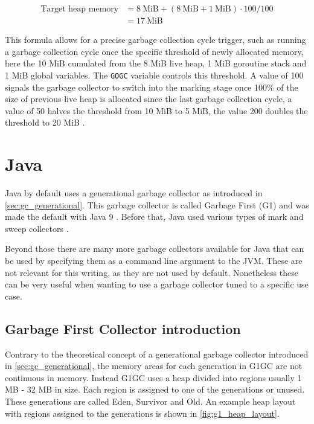 \begin{align}
    \textrm{Target heap memory} &= 8 \ \textrm{MiB} + \left(8 \ \textrm{MiB} + 1 \ \textrm{MiB}\right) \cdot 100 / 100 \\
                                &= 17 \ \textrm{MiB}
\end{align}

This formula allows for a precise garbage collection cycle trigger, such as
running a garbage collection cycle once the specific threshold of newly
allocated memory, here the 10 MiB cumulated from the 8 MiB live heap, 1 MiB
goroutine stack and 1 MiB global variables. The \texttt{GOGC} variable controls
this threshold. A value of 100 signals the garbage collector to switch into the
marking stage once 100\% of the size of previous live heap is allocated since
the last garbage collection cycle, a value of 50 halves the threshold from 10
MiB to 5 MiB, the value 200 doubles the threshold to 20 MiB
\cite[GOGC]{go_gcguide_2022}.

\section{Java}

Java by default uses a generational garbage collector as introduced in
\autoref{sec:gc_generational}. This garbage collector is called Garbage First
(G1) and was made the default with Java 9 \cite{java_gc_comparison_2018}.
Before that, Java used various types of mark and sweep collectors
\cite{java_available_gcs}.

Beyond those there are many more garbage collectors available for Java that can
be used by specifying them as a command line argument to the JVM. These are not
relevant for this writing, as they are not used by default. Nonetheless these
can be very useful when wanting to use a garbage collector tuned to a specific
use case.

\subsection{Garbage First Collector introduction}

Contrary to the theoretical concept of a generational garbage collector introduced in \autoref{sec:gc_generational},
the memory areas for each generation in G1GC are not continuous in memory.
Instead G1GC uses a heap divided into regions usually 1 MB - 32 MB in size.
Each region is assigned to one of the generations or unused.
These generations are called Eden, Survivor and Old. \cite{java_g1_getting_started}
An example heap layout with regions assigned to the generations is shown in \autoref{fig:g1_heap_layout}.

